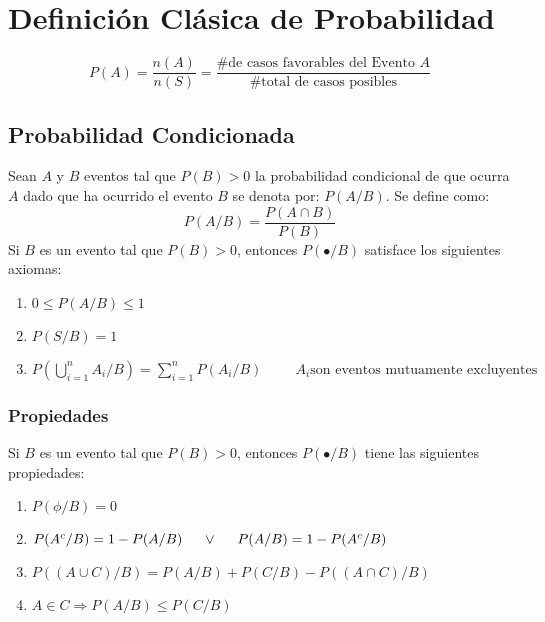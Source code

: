 \section{Definición Clásica de Probabilidad}
$$P(A)=\dfrac{n(A)}{n(S)}=\dfrac{\textrm{\# de casos favorables del Evento $A$}}{\textrm{\# total de casos posibles}}$$
\subsection{Probabilidad Condicionada}
Sean $A$ y $B$ eventos tal que $P(B)>0$ la probabilidad condicional de que ocurra $A$ dado que ha ocurrido el evento $B$ se denota por: $P(A/B)$. Se define como:
$$P(A/B)=\dfrac{P(A\cap B)}{P(B)}$$
Si $B$ es un evento tal que $P(B)>0$, entonces $P(\bullet/B)$ satisface los siguientes axiomas:
\begin{enumerate}[label=(\roman*)]
\item $0\leq P(A/B)\leq 1$
\item $P(S/B)=1$
\item $P\left( \bigcup\limits_{i=1}^{n} A_i/B\right)=
\displaystyle\sum_{i=1}^{n}P(A_i/B) \hspace{1cm}A_i \textrm{son eventos mutuamente excluyentes}$
\end{enumerate}
\subsubsection{Propiedades}
Si $B$ es un evento tal que $P(B)>0$, entonces $P(\bullet/B)$ tiene las siguientes propiedades:
\begin{enumerate}
\item $P(\phi/B)=0$
\item $P(A^c/B)=1-P(A/B)\hspace{0.5cm} \vee \hspace{0.5cm} P(A/B)=1-P(A^c/B) $
\item $P((A\cup C)/B)=P(A/B)+P(C/B)-P((A\cap C)/B)$
\item $A\in C \Rightarrow P(A/B)\leq P(C/B)$
\end{enumerate}